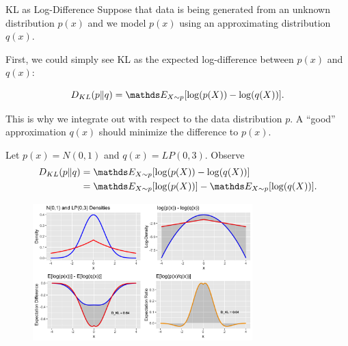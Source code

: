 \documentclass[11pt,compress,t,notes=noshow, xcolor=table]{beamer}
\begin{document}
\begin{vbframe} {KL as Log-Difference}
Suppose that data is being generated from an unknown distribution $p(x)$ and we model $p(x)$ using an approximating distribution $q(x)$. 

\lz

First, we could simply see KL as the expected log-difference between $p(x)$ and $q(x)$:

  $$ D_{KL}(p \| q) = \E_{X \sim p}[\log(p(X)) - \log(q(X))].$$

This is why we integrate out with respect to the data distribution $p$.
A \enquote{good} approximation $q(x)$ should minimize the difference to $p(x)$.

\usetikzlibrary{shapes, arrows.meta}
\begin{center}
\end{center}
\framebreak

Let $p(x)=N(0,1)$ and $q(x)=LP(0, 3)$. Observe
\begin{equation*}
    \begin{aligned}   
   D_{KL}(p \| q)&= \E_{X \sim p}[\log(p(X)) - \log(q(X))] \\
  				 &= \E_{X \sim p}[\log(p(X))]-\E_{X \sim p}[\log(q(X))].
    \end{aligned} 
  \end{equation*}
  
\begin{figure}
\includegraphics[width = 8.5cm ]{figure/kl_log_diff.png} 
\end{figure}


\end{vbframe}
\end{document}
